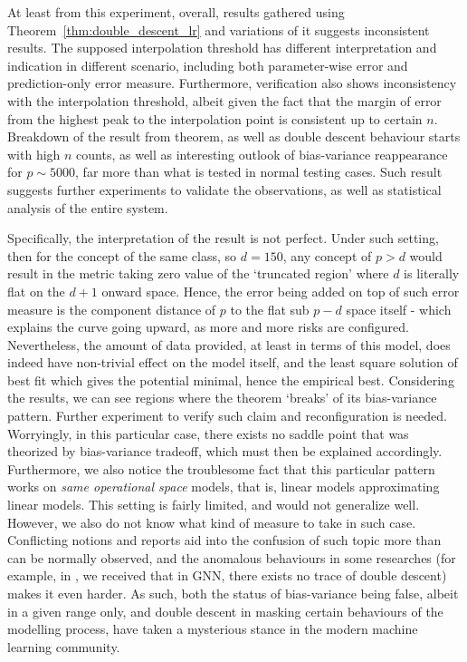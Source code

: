 \documentclass[10pt]{article}
\begin{document}
At least from this experiment, overall, results gathered using Theorem~\ref{thm:double_descent_lr} and variations of it suggests inconsistent results. The supposed interpolation threshold has different interpretation and indication in different scenario, including both parameter-wise error and prediction-only error measure. Furthermore, verification also shows inconsistency with the interpolation threshold, albeit given the fact that the margin of error from the highest peak to the interpolation point is consistent up to certain $n$. Breakdown of the result from theorem, as well as double descent behaviour starts with high $n$ counts, as well as interesting outlook of bias-variance reappearance for $p\sim 5000$, far more than what is tested in normal testing cases. Such result suggests further experiments to validate the observations, as well as statistical analysis of the entire system. 

Specifically, the interpretation of the result is not perfect. Under such setting, then for the concept of the same class, so $d=150$, any concept of $p>d$ would result in the metric taking zero value of the `truncated region' where $d$ is literally flat on the $d+1$ onward space. Hence, the error being added on top of such error measure is the component distance of $p$ to the flat sub $p-d$ space itself - which explains the curve going upward, as more and more risks are configured. Nevertheless, the amount of data provided, at least in terms of this model, does indeed have non-trivial effect on the model itself, and the least square solution of best fit which gives the potential minimal, hence the empirical best. Considering the results, we can see regions where the theorem `breaks' of its bias-variance pattern. Further experiment to verify such claim and reconfiguration is needed. Worryingly, in this particular case, there exists no saddle point that was theorized by bias-variance tradeoff, which must then be explained accordingly. Furthermore, we also notice the troublesome fact that this particular pattern works on \textit{same operational space} models, that is, linear models approximating linear models. This setting is fairly limited, and would not generalize well. However, we also do not know what kind of measure to take in such case. Conflicting notions and reports aid into the confusion of such topic more than can be normally observed, and the anomalous behaviours in some researches (for example, in \cite{shi2024homophilymodulatesdoubledescent}, we received that in GNN, there exists no trace of double descent) makes it even harder. As such, both the status of bias-variance being false, albeit in a given range only, and double descent in masking certain behaviours of the modelling process, have taken a mysterious stance in the modern machine learning community.
\end{document}
